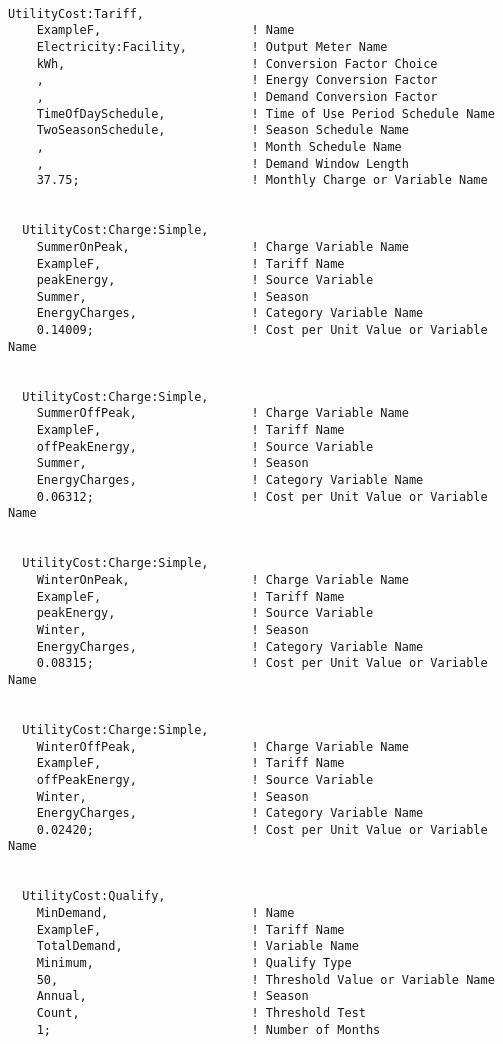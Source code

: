 \begin{lstlisting}

UtilityCost:Tariff,
    ExampleF,                     ! Name
    Electricity:Facility,         ! Output Meter Name
    kWh,                          ! Conversion Factor Choice
    ,                             ! Energy Conversion Factor
    ,                             ! Demand Conversion Factor
    TimeOfDaySchedule,            ! Time of Use Period Schedule Name
    TwoSeasonSchedule,            ! Season Schedule Name
    ,                             ! Month Schedule Name
    ,                             ! Demand Window Length
    37.75;                        ! Monthly Charge or Variable Name


  UtilityCost:Charge:Simple,
    SummerOnPeak,                 ! Charge Variable Name
    ExampleF,                     ! Tariff Name
    peakEnergy,                   ! Source Variable
    Summer,                       ! Season
    EnergyCharges,                ! Category Variable Name
    0.14009;                      ! Cost per Unit Value or Variable Name


  UtilityCost:Charge:Simple,
    SummerOffPeak,                ! Charge Variable Name
    ExampleF,                     ! Tariff Name
    offPeakEnergy,                ! Source Variable
    Summer,                       ! Season
    EnergyCharges,                ! Category Variable Name
    0.06312;                      ! Cost per Unit Value or Variable Name


  UtilityCost:Charge:Simple,
    WinterOnPeak,                 ! Charge Variable Name
    ExampleF,                     ! Tariff Name
    peakEnergy,                   ! Source Variable
    Winter,                       ! Season
    EnergyCharges,                ! Category Variable Name
    0.08315;                      ! Cost per Unit Value or Variable Name


  UtilityCost:Charge:Simple,
    WinterOffPeak,                ! Charge Variable Name
    ExampleF,                     ! Tariff Name
    offPeakEnergy,                ! Source Variable
    Winter,                       ! Season
    EnergyCharges,                ! Category Variable Name
    0.02420;                      ! Cost per Unit Value or Variable Name


  UtilityCost:Qualify,
    MinDemand,                    ! Name
    ExampleF,                     ! Tariff Name
    TotalDemand,                  ! Variable Name
    Minimum,                      ! Qualify Type
    50,                           ! Threshold Value or Variable Name
    Annual,                       ! Season
    Count,                        ! Threshold Test
    1;                            ! Number of Months



\end{lstlisting}
